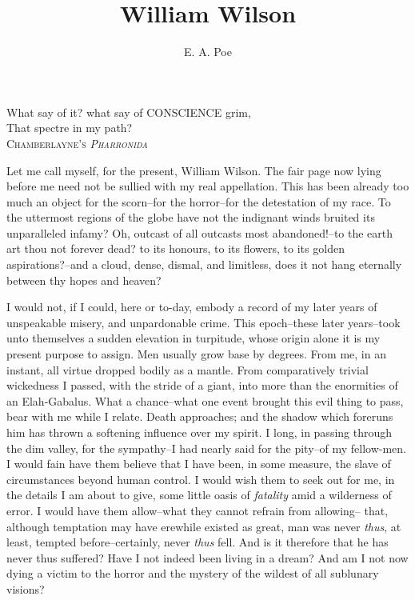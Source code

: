 \documentclass[12pt]{book}
\begin{document}
\title{William Wilson}
\author{E. A. Poe}
\date{}

\maketitle

\hfill
\parbox[b]{8cm}{
\scriptsize
What say of it? what say of CONSCIENCE grim,\\
That spectre in my path?\\
\mbox{}\hspace{2cm} \scshape{Chamberlayne}'s \emph{Pharronida}\\
}

\vskip 1cm

     Let me call myself, for the present, William Wilson.  The fair
page now lying before me need not be sullied with my real
appellation.  This has been already too much an object for the
scorn--for the horror--for the detestation of my race.  To the
uttermost regions of the globe have not the indignant winds bruited
its unparalleled infamy?  Oh, outcast of all outcasts most
abandoned!--to the earth art thou not forever dead? to its honours,
to its flowers, to its golden aspirations?--and a cloud, dense,
dismal, and limitless, does it not hang eternally between thy hopes
and heaven?

     I would not, if I could, here or to-day, embody a record of my
later years of unspeakable misery, and unpardonable crime.  This
epoch--these later years--took unto themselves a sudden elevation
in turpitude, whose origin alone it is my present purpose to
assign.  Men usually grow base by degrees.  From me, in an instant,
all virtue dropped bodily as a mantle.  From comparatively trivial
wickedness I passed, with the stride of a giant, into more than the
enormities of an Elah-Gabalus.  What a chance--what one event
brought this evil thing to pass, bear with me while I relate. 
Death approaches; and the shadow which foreruns him has thrown a
softening influence over my spirit.  I long, in passing through the
dim valley, for the sympathy--I had nearly said for the pity--of my
fellow-men.  I would fain have them believe that I have been, in
some measure, the slave of circumstances beyond human control.  I
would wish them to seek out for me, in the details I am about to
give, some little oasis of \emph{fatality} amid a wilderness of error. 
I would have them allow--what they cannot refrain from allowing--
that, although temptation may have erewhile existed as great, man
was never \emph{thus}, at least, tempted before--certainly, never 
\emph{thus} fell.  And is it therefore that he has never thus suffered? 
Have I not indeed been living in a dream?  And am I not now dying
a victim to the horror and the mystery of the wildest of all
sublunary visions?  
\end{document}
